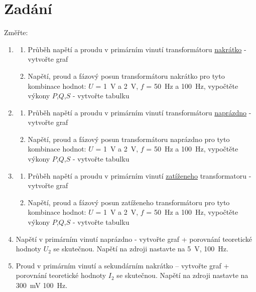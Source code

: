 \documentclass[a4paper]{article}
\begin{document}
\section*{Zadání}
Zm\v{e}\v{r}te:
\begin{enumerate}
	\item \begin{enumerate}
		\item Pr\r{u}b\v{e}h nap\v{e}t\'i a proudu v prim\'arn\'im vinut\'i transform\'atoru \underline{nakr\'atko} - vytvo\v{r}te graf
		\item \label{1b} Nap\v{e}t\'i, proud a f\'azov\'y posun transform\'atoru nakr\'atko pro tyto kombinace hodnot: $U$ = \SI{1}{\volt} a \SI{2}{\volt}, $f$ = \SI{50}{\hertz} a \SI{100}{\hertz}, vypo\v{c}t\v{e}te v\'ykony $P$,$Q$,$S$ - vytvo\v{r}te tabulku
	\end{enumerate}
	\item \begin{enumerate}
		\item Pr\r{u}b\v{e}h nap\v{e}t\'i a proudu v prim\'arn\'im vinut\'i transform\'atoru \underline{napr\'azdno} - vytvo\v{r}te graf
		\item  \label{2b} Nap\v{e}t\'i, proud a f\'azov\'y posun transform\'atoru napr\'azdno pro tyto kombinace hodnot: $U$ = \SI{1}{\volt} a \SI{2}{\volt}, $f$ = \SI{50}{\hertz} a \SI{100}{\hertz}, vypo\v{c}t\v{e}te v\'ykony $P$,$Q$,$S$ - vytvo\v{r}te tabulku
	\end{enumerate}
	\item \begin{enumerate}
		\item Pr\r{u}b\v{e}h nap\v{e}t\'i a proudu v prim\'arn\'im vinut\'i \underline{zat\'i\v{z}eneho} transformatoru - vytvo\v{r}te graf
		\item \label{3b} Nap\v{e}t\'i, proud a f\'azov\'y posun zat\'i\v{z}eneho transform\'atoru pro tyto kombinace hodnot: $U$ = \SI{1}{\volt} a \SI{2}{\volt}, $f$ = \SI{50}{\hertz} a \SI{100}{\hertz}, vypo\v{c}t\v{e}te v\'ykony $P$,$Q$,$S$ - vytvo\v{r}te tabulku
	\end{enumerate}
	\item \label{4} Nap\v{e}t\'i v prim\'arn\'im vinut\'i napr\'azdno - vytvo\v{r}te graf + porovn\'an\'i teoretick\'e hodnoty $U_2$ se skute\v{c}nou. Nap\v{e}t\'i na zdroji nastavte na \SI{5}{\volt}, \SI{100}{\hertz}.
	\item \label{5} Proud v prim\'arn\'im vinut\'i a sekund\'arn\'im nakr\'atko – vytvo\v{r}te graf + porovn\'an\'i teoretick\'e hodnoty $I_2$ se skute\v{c}nou. Nap\v{e}t\'i na zdroji nastavte na \SI{300}{\milli\volt} \SI{100}{\hertz}.\\
\end{enumerate}
\end{document}
